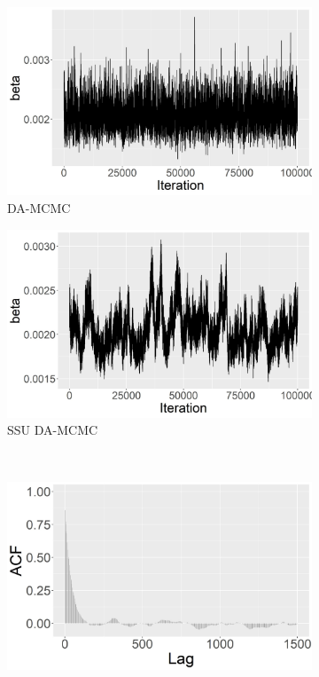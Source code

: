 \documentclass[11pt]{article}
\begin{document}
	\begin{figure}
		\centering
		\begin{subfigure}[b]{0.42\textwidth}
			\centering
			\includegraphics[width=\textwidth]{E6_no_burn_beta_tp_joint.jpg}
			\caption{DA-MCMC}
			\label{fig:E6_no_burn_beta_tp_joint}
		\end{subfigure}
		\hfill
		\begin{subfigure}[b]{0.41\textwidth}
			\centering
			\includegraphics[width=\textwidth]{E6_no_burn_beta_tp_single.jpg}
			\caption{SSU DA-MCMC}
			\label{fig:E6_no_burn_beta_tp_single}
		\end{subfigure}
		\\
		\begin{subfigure}[b]{0.42\textwidth}
			\centering
			\includegraphics[width=\textwidth]{E6_burn_beta_acf_joint.jpg}

\end{subfigure}
\end{figure}
\end{document}
